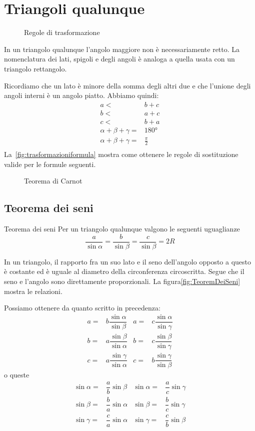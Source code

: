 \section{Triangoli qualunque}
\begin{figure}
	\centering
	
	\caption{Regole di trasformazione}
	\label{fig:trasformazioniformula}
\end{figure}
In un triangolo qualunque l'angolo maggiore non è necessariamente retto. La nomenclatura dei lati, spigoli e degli angoli è analoga a quella usata con un triangolo rettangolo. 

Ricordiamo che un lato è minore della somma degli altri due e che l'unione degli angoli interni è un angolo piatto. Abbiamo quindi:
 \begin{align*}
a<&b+c\\
b<&a+c\\
c<&b+a\\
\alpha+\beta+\gamma=&\ang{180}\\
\alpha+\beta+\gamma=&\frac{\pi}{2}\\
\end{align*}
La~\vref{fig:trasformazioniformula} mostra come ottenere le regole di sostituzione valide per le formule seguenti.
\begin{figure}
	\centering
	
	\caption{Teorema di Carnot}
	\label{fig:TeoremDiCarnot_1}
\end{figure}
\subsection{Teorema dei seni}
\begin{teoremat}{Teorema dei seni}{}
Per un triangolo qualunque valgono le seguenti uguaglianze\[\dfrac{a}{\sin\alpha}=\dfrac{b}{\sin\beta}=\dfrac{c}{\sin\beta}=2R \]
\end{teoremat}
In un triangolo, il rapporto fra un suo  lato e il seno dell'angolo opposto a questo è costante ed  è uguale al diametro della circonferenza circoscritta. Segue  che il seno e l'angolo sono direttamente proporzionali. La figura\nobs\vref{fig:TeoremDeiSeni} mostra le relazioni.

Possiamo ottenere da quanto scritto in precedenza: 
\begin{align*}
a=&b\dfrac{\sin\alpha}{\sin\beta}& a=&c\dfrac{\sin\alpha}{\sin\gamma}\\
b=&a\dfrac{\sin\beta}{\sin\alpha}& b=&c\dfrac{\sin\beta}{\sin\gamma}\\
c=&a\dfrac{\sin\gamma}{\sin\alpha}& c=&b\dfrac{\sin\gamma}{\sin\beta}
\end{align*}
o queste
\begin{align*}
\sin\alpha=&\dfrac{a}{b}\sin\beta&\sin\alpha=&\dfrac{a}{c}\sin\gamma\\
\sin\beta=&\dfrac{b}{a}\sin\alpha&\sin\beta=&\dfrac{b}{c}\sin\gamma\\
\sin\gamma=&\dfrac{c}{a}\sin\alpha&\sin\gamma=&\dfrac{c}{b}\sin\beta\\
\end{align*}
